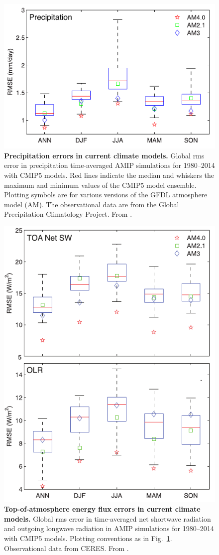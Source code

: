 \documentclass{article}
\begin{document}
\begin{enumerate}
\begin{figure}[htb]
     \centerline{\includegraphics[width=.6\textwidth]{Zhao18a-Fig-14.pdf}}
      \caption{\textbf{Precipitation errors in current climate models.} Global rms error in precipitation time-averaged AMIP simulations  for 1980--2014 with CMIP5 models. Red lines indicate the median and whiskers the maximum and minimum values of the CMIP5 model ensemble. Plotting symbols are for various versions of the GFDL atmosphere model (AM). The observational data are from the Global Precipitation Climatology Project. From \protect\citet{Zhao18b}.}\label{f:CMIP-precip-error}
\end{figure}
\begin{figure}[htb]
     \centerline{\includegraphics[width=.6\textwidth]{Zhao18a-Fig-15-16.pdf}}
      \caption{\textbf{Top-of-atmosphere energy flux errors in current climate models.} Global rms error in time-averaged net shortwave radiation and outgoing longwave radiation in AMIP simulations for 1980--2014 with CMIP5 models. Plotting conventions as in Fig.~\ref{f:CMIP-precip-error}. Observational data from CERES. From \protect\citet{Zhao18b}.}\label{f:CMIP-TOA-error}
 \end{figure}
        

\end{enumerate}
\end{document}
